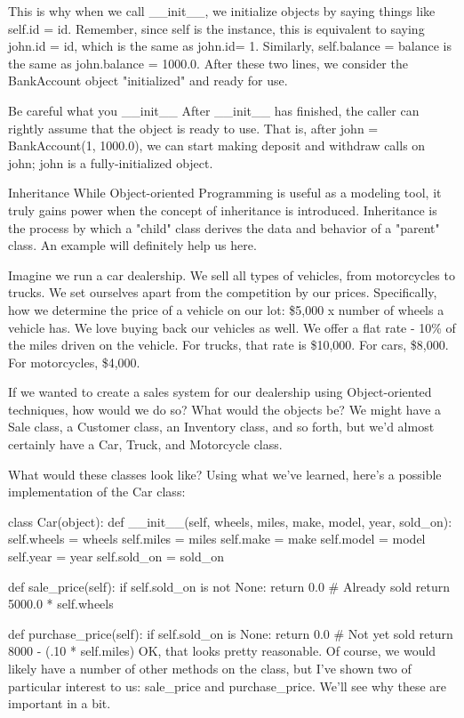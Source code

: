 This is why when we call __init__, we initialize objects by saying things like self.id = id. Remember, since self is the instance, this is equivalent to saying john.id = id, which is the same as john.id= 1. Similarly, self.balance = balance is the same as john.balance = 1000.0. After these two lines, we consider the BankAccount object "initialized" and ready for use.

Be careful what you __init__
After __init__ has finished, the caller can rightly assume that the object is ready to use. That is, after john = BankAccount(1, 1000.0), we can start making deposit and withdraw calls on john; john is a fully-initialized object.

Inheritance
While Object-oriented Programming is useful as a modeling tool, it truly gains power when the concept of inheritance is introduced. Inheritance is the process by which a "child" class derives the data and behavior of a "parent" class. An example will definitely help us here.

Imagine we run a car dealership. We sell all types of vehicles, from motorcycles to trucks. We set ourselves apart from the competition by our prices. Specifically, how we determine the price of a vehicle on our lot: \$5,000 x number of wheels a vehicle has. We love buying back our vehicles as well. We offer a flat rate - 10\% of the miles driven on the vehicle. For trucks, that rate is \$10,000. For cars, \$8,000. For motorcycles, \$4,000.

If we wanted to create a sales system for our dealership using Object-oriented techniques, how would we do so? What would the objects be? We might have a Sale class, a Customer class, an Inventory class, and so forth, but we'd almost certainly have a Car, Truck, and Motorcycle class.

What would these classes look like? Using what we've learned, here's a possible implementation of the Car class:

class Car(object):
    def __init__(self, wheels, miles, make, model, year, sold_on):
        self.wheels = wheels
        self.miles = miles
        self.make = make
        self.model = model
        self.year = year
        self.sold_on = sold_on

    def sale_price(self):
        if self.sold_on is not None:
            return 0.0  # Already sold
        return 5000.0 * self.wheels

    def purchase_price(self):
        if self.sold_on is None:
            return 0.0  # Not yet sold
        return 8000 - (.10 * self.miles)
OK, that looks pretty reasonable. Of course, we would likely have a number of other methods on the class, but I've shown two of particular interest to us: sale_price and purchase_price. We'll see why these are important in a bit.


